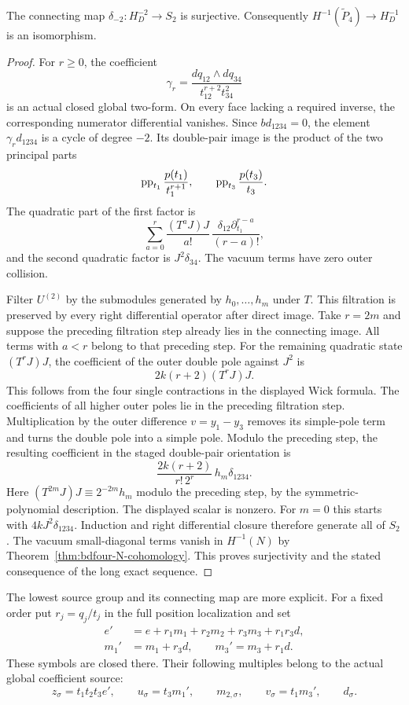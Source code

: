 \begin{proposition}\label{prop:bdfour-small-surjection}
The connecting map $\delta_{-2}:H_D^{-2}\to S_2$ is surjective.
Consequently $H^{-1}(\widetilde P_4)\to H_D^{-1}$ is an isomorphism.
\end{proposition}
\begin{proof}
For $r\geq0$, the coefficient
\[
 \gamma_r=\frac{dq_{12}\wedge dq_{34}}{t_{12}^{r+2}t_{34}^2}
\]
is an actual closed global two-form.
On every face lacking a required inverse, the corresponding numerator differential vanishes.
Since $bd_{1234}=0$, the element $\gamma_rd_{1234}$ is a cycle of degree $-2$.
Its double-pair image is the product of the two principal parts
\[
 \operatorname{pp}_{t_1}\frac{p(t_1)}{t_1^{r+1}},\qquad
 \operatorname{pp}_{t_3}\frac{p(t_3)}{t_3}.
\]
The quadratic part of the first factor is
\[
 \sum_{a=0}^r\frac{(T^aJ)J}{a!}\,
             \frac{\delta_{12}\partial_{t_1}^{r-a}}{(r-a)!},
\]
and the second quadratic factor is $J^2\delta_{34}$.
The vacuum terms have zero outer collision.

Filter $U^{(2)}$ by the submodules generated by $h_0,\ldots,h_m$ under $T$.
This filtration is preserved by every right differential operator after direct image.
Take $r=2m$ and suppose the preceding filtration step already lies in the connecting image.
All terms with $a<r$ belong to that preceding step.
For the remaining quadratic state $(T^rJ)J$, the coefficient of the outer double pole against $J^2$ is
\[
 2k(r+2)(T^rJ)J.
\]
This follows from the four single contractions in the displayed Wick formula.
The coefficients of all higher outer poles lie in the preceding filtration step.
Multiplication by the outer difference $v=y_1-y_3$ removes its simple-pole term and turns the double pole into a simple pole.
Modulo the preceding step, the resulting coefficient in the staged double-pair orientation is
\[
 \frac{2k(r+2)}{r!\,2^r}\,h_m\delta_{1234}.
\]
Here $(T^{2m}J)J\equiv2^{-2m}h_m$ modulo the preceding step, by the symmetric-polynomial description.
The displayed scalar is nonzero.
For $m=0$ this starts with $4kJ^2\delta_{1234}$.
Induction and right differential closure therefore generate all of $S_2$.
The vacuum small-diagonal terms vanish in $H^{-1}(N)$ by Theorem~\ref{thm:bdfour-N-cohomology}.
This proves surjectivity and the stated consequence of the long exact sequence.
\end{proof}

The lowest source group and its connecting map are more explicit.
For a fixed order put $r_j=q_j/t_j$ in the full position localization and set
\[
 \begin{aligned}
 e'&=e+r_1m_1+r_2m_2+r_3m_3+r_1r_3d,\\
 m_1'&=m_1+r_3d,\qquad m_3'=m_3+r_1d.
 \end{aligned}
\]
These symbols are closed there.
Their following multiples belong to the actual global coefficient source:
\begin{equation}\label{eq:bdfour-lowest-basis}
 z_\sigma=t_1t_2t_3e',\qquad
 u_\sigma=t_3m_1',\qquad m_{2,\sigma},\qquad
 v_\sigma=t_1m_3',\qquad d_\sigma.
\end{equation}

